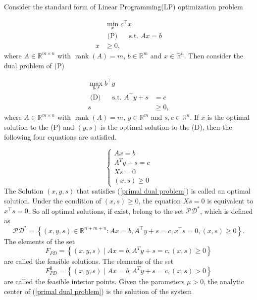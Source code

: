 Consider the standard form of Linear Programming(LP) optimization problem

\begin{equation}\label{primal problem}
\begin{aligned}
& \min _x c^{\top} x \\
& \text { (P) } \quad \text { s.t. } A x=b \\
x &\geq 0,
\end{aligned}
\end{equation}
where $A\in \mathbb{R}^{m \times n}$ with $\operatorname{rank}(A)=m$, $ b \in \mathbb{R}^m$ and $x \in \mathbb{R}^n$. Then consider the dual problem of (P)

\begin{equation}\label{dual problem}
\begin{aligned}
\max _{y, s} b^{\top} y & \\
\text { (D) } \quad \text { s.t. } A^{\top} y+s & =c \\
s & \geq 0,
\end{aligned}
\end{equation}
where $A\in \mathbb{R}^{m \times n}$ with $\operatorname{rank}(A)=m$, $y \in \mathbb{R}^m$ and $s, c \in \mathbb{R}^n$. If $x$ is the optimal solution to the (P) and $(y, s)$ is the optimal solution to the (D), then the following four equations are satisfied.

\begin{equation}
\left\{\begin{array}{l}
A x=b \\
A^T y+s=c \\
X s=0 \\
(x, s) \geq 0
\end{array}\right.
\end{equation}
The Solution $(x, y, s)$ that satisfies (\ref{primal dual problem}) is called an \alert{optimal solution}. Under the condition of $(x, s) \geq 0$, the equation $Xs = 0$ is \alert{equivalent} to $x^{\top}s = 0$. So all optimal solutions, if exist, belong to the set $\mathcal{P} \mathcal{D}^*$, which is defined as
$$
\mathcal{PD}^*=\left\{(x, y, s) \in \mathbb{R}^{n+m+n}: A x=b, A^{\top} y+s=c, x^{\top} s=0,(x, s) \geq 0\right\}.
$$
The elements of the set 
$$
F_{P D}=\left\{(x, y, s) \mid A x=b, A^T y+s=c, (x,s) \geq 0 \right\}
$$
are called the \alert{feasible solutions}. The elements of the set 
$$
F_{P D}^0=\left\{(x, y, s) \mid A x=b, A^T y+s=c, (x,s) > 0 \right\}
$$
are called the \alert{feasible interior points}. Given the parameters $\mu>0$, the \alert{analytic center} of (\ref{primal dual problem}) is the solution of the system

